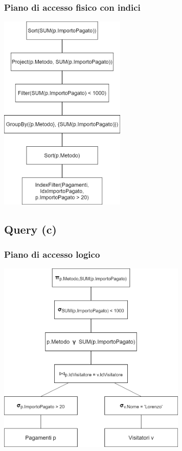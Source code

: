 \documentclass[a4paper, 12pt]{article}
\begin{document}
\subsubsection{Piano di accesso fisico con indici}
\begin{center}
    \includegraphics[width=6cm]{pianoIdxQueryB.png}
\end{center}   

\subsection{Query (c)}
\subsubsection{Piano di accesso logico}
\begin{center}
    \includegraphics[width=9cm]{pianoLogicoQueryC.png}
\end{center}
\end{document}

